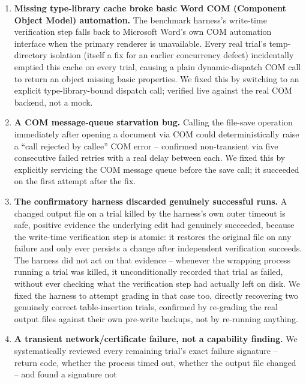 \documentclass[11pt]{article}
\DeclareRobustCommand{\claim}[2]{#2}
\begin{document}
\begin{enumerate}
\item\label{def:typelib-cache} \claim{com-type-library-cache-defect}{\textbf{Missing type-library cache broke basic Word COM (Component Object Model)
  automation.}} \claim{sequential-backend-fallback-order}{The benchmark harness's write-time verification step falls back to Microsoft
  Word's own COM automation interface when the primary renderer is unavailable.} Every real
  trial's temp-directory isolation (itself a fix for an earlier concurrency defect) incidentally
  emptied this cache on every trial, causing a plain dynamic-dispatch COM call to return an
  object missing basic properties. We fixed this by switching to an explicit type-library-bound
  dispatch call; verified live against the real COM backend, not a mock.
\item\label{def:com-queue} \textbf{A COM message-queue starvation bug.} Calling the file-save operation immediately
  after opening a document via COM could deterministically raise a
  ``call rejected by callee'' COM error -- confirmed non-transient via five consecutive failed
  retries with a real delay between each. We fixed this by explicitly servicing the COM message
  queue before the save call; it succeeded on the first attempt after the fix.
\item\label{def:discarded-runs} \textbf{The confirmatory harness discarded genuinely successful runs.} A changed output
  file on a trial killed by the harness's own outer timeout is safe, positive evidence the
  underlying edit had genuinely succeeded, \claim{never-persist-corrupt-document}{because the write-time verification step is atomic:
  it restores the original file on any failure and only ever persists a change after independent
  verification succeeds.} The harness did not act on that evidence -- whenever the wrapping
  process running a trial was killed, it unconditionally recorded that trial as failed, without
  ever checking what the verification step had actually left on disk. \claim{defect-3-table-recovery}{We fixed the harness to
  attempt grading in that case too, directly recovering two genuinely correct table-insertion
  trials, confirmed by re-grading the real output files against their own pre-write backups, not
  by re-running anything.}
\item\label{def:cert-failure} \textbf{A transient network/certificate failure, not a capability finding.} We
  systematically reviewed every remaining trial's exact failure signature -- return code,
  whether the process timed out, whether the output file changed -- and found a signature not

\end{enumerate}
\end{document}
